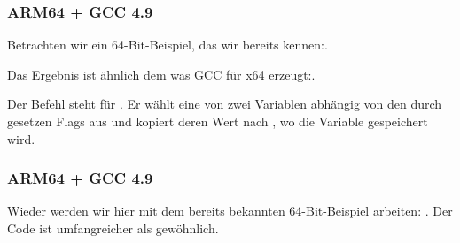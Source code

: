 \subsubsection{ARM64 + \Optimizing GCC 4.9}
Betrachten wir ein 64-Bit-Beispiel, das wir bereits
kennen:.


Das Ergebnis ist ähnlich dem was GCC für x64 erzeugt:.

Der Befehl \CSEL steht für .
Er wählt eine von zwei Variablen abhängig von den durch \TST gesetzen Flags aus
und kopiert deren Wert nach , wo die Variable  gespeichert wird.

\subsubsection{ARM64 + \NonOptimizing GCC 4.9}
Wieder werden wir hier mit dem bereits bekannten 64-Bit-Beispiel arbeiten:
.
Der Code ist umfangreicher als gewöhnlich.



